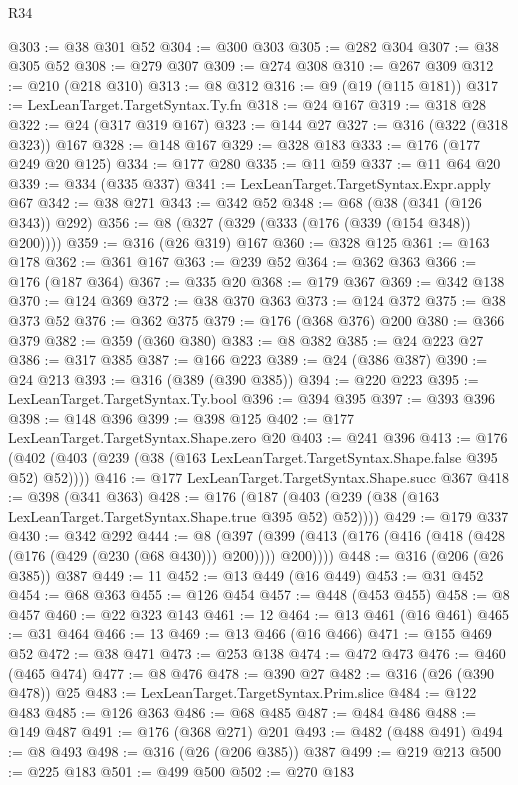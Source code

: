 \begin{lexlean}{R34}
\begin{coremodule}
@303 := @38 @301 @52
@304 := @300 @303
@305 := @282 @304
@307 := @38 @305 @52
@308 := @279 @307
@309 := @274 @308
@310 := @267 @309
@312 := @210 (@218 @310)
@313 := @8 @312
@316 := @9 (@19 (@115 @181))
@317 := LexLeanTarget.TargetSyntax.Ty.fn
@318 := @24 @167
@319 := @318 @28
@322 := @24 (@317 @319 @167)
@323 := @144 @27
@327 := @316 (@322 (@318 @323)) @167
@328 := @148 @167
@329 := @328 @183
@333 := @176 (@177 @249 @20 @125)
@334 := @177 @280
@335 := @11 @59
@337 := @11 @64 @20
@339 := @334 (@335 @337)
@341 := LexLeanTarget.TargetSyntax.Expr.apply @67
@342 := @38 @271
@343 := @342 @52
@348 := @68 (@38 (@341 (@126 @343)) @292)
@356 := @8 (@327 (@329 (@333 (@176 (@339 (@154 @348)) @200))))
@359 := @316 (@26 @319) @167
@360 := @328 @125
@361 := @163 @178
@362 := @361 @167
@363 := @239 @52
@364 := @362 @363
@366 := @176 (@187 @364)
@367 := @335 @20
@368 := @179 @367
@369 := @342 @138
@370 := @124 @369
@372 := @38 @370 @363
@373 := @124 @372
@375 := @38 @373 @52
@376 := @362 @375
@379 := @176 (@368 @376) @200
@380 := @366 @379
@382 := @359 (@360 @380)
@383 := @8 @382
@385 := @24 @223 @27
@386 := @317 @385
@387 := @166 @223
@389 := @24 (@386 @387)
@390 := @24 @213
@393 := @316 (@389 (@390 @385))
@394 := @220 @223
@395 := LexLeanTarget.TargetSyntax.Ty.bool
@396 := @394 @395
@397 := @393 @396
@398 := @148 @396
@399 := @398 @125
@402 := @177 LexLeanTarget.TargetSyntax.Shape.zero @20
@403 := @241 @396
@413 := @176 (@402 (@403 (@239 (@38 (@163 LexLeanTarget.TargetSyntax.Shape.false @395 @52) @52))))
@416 := @177 LexLeanTarget.TargetSyntax.Shape.succ @367
@418 := @398 (@341 @363)
@428 := @176 (@187 (@403 (@239 (@38 (@163 LexLeanTarget.TargetSyntax.Shape.true @395 @52) @52))))
@429 := @179 @337
@430 := @342 @292
@444 := @8
    (@397 (@399 (@413 (@176 (@416 (@418 (@428 (@176 (@429 (@230 (@68 @430))) @200)))) @200))))
@448 := @316 (@206 (@26 @385)) @387
@449 := 11
@452 := @13 @449 (@16 @449)
@453 := @31 @452
@454 := @68 @363
@455 := @126 @454
@457 := @448 (@453 @455)
@458 := @8 @457
@460 := @22 @323 @143
@461 := 12
@464 := @13 @461 (@16 @461)
@465 := @31 @464
@466 := 13
@469 := @13 @466 (@16 @466)
@471 := @155 @469 @52
@472 := @38 @471
@473 := @253 @138
@474 := @472 @473
@476 := @460 (@465 @474)
@477 := @8 @476
@478 := @390 @27
@482 := @316 (@26 (@390 @478)) @25
@483 := LexLeanTarget.TargetSyntax.Prim.slice
@484 := @122 @483
@485 := @126 @363
@486 := @68 @485
@487 := @484 @486
@488 := @149 @487
@491 := @176 (@368 @271) @201
@493 := @482 (@488 @491)
@494 := @8 @493
@498 := @316 (@26 (@206 @385)) @387
@499 := @219 @213
@500 := @225 @183
@501 := @499 @500
@502 := @270 @183

\end{coremodule}
\end{lexlean}
